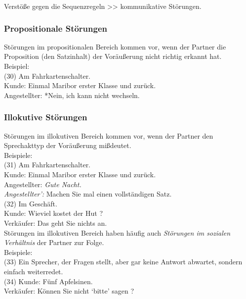 \documentclass[
  letterpaper,
]{scrbook}
\begin{document}
Verstöße gegen die Sequenzregeln \textgreater\textgreater{}
kommunikative Störungen.\\

\hypertarget{propositionale-stuxf6rungen}{%
\subsubsection{Propositionale
Störungen}\label{propositionale-stuxf6rungen}}

Störungen im propositionalen Bereich kommen vor, wenn der Partner die
Proposition (den Satzinhalt) der Voräußerung nicht richtig erkannt
hat.\\
Beispiel:\\
(30) Am Fahrkartenschalter.\\
Kunde: Einmal Maribor erster Klasse und zurück.\\
Angestellter: *Nein, ich kann nicht wechseln.\\

\hypertarget{illokutive-stuxf6rungen}{%
\subsubsection{Illokutive Störungen}\label{illokutive-stuxf6rungen}}

Störungen im illokutiven Bereich kommen vor, wenn der Partner den
Sprechakttyp der Voräußerung mißdeutet.\\

Beispiele:\\
(31) Am Fahrkartenschalter.\\
Kunde: Einmal Maribor erster Klasse und zurück.\\
Angestellter: \emph{Gute Nacht.\\
Angestellter': }Machen Sie mal einen vollständigen Satz.\\
(32) Im Geschäft.\\
Kunde: Wieviel kostet der Hut ?\\
Verkäufer: Das geht Sie nichts an.\\

Störungen im illokutiven Bereich haben häufig auch \emph{Störungen im
sozialen Verhältnis} der Partner zur Folge.\\
Beispiele:\\
(33) Ein Sprecher, der Fragen stellt, aber gar keine Antwort abwartet,
sondern einfach weiterredet.\\
(34) Kunde: Fünf Apfelsinen.\\
Verkäufer: Können Sie nicht `bitte' sagen ?\\
\end{document}
